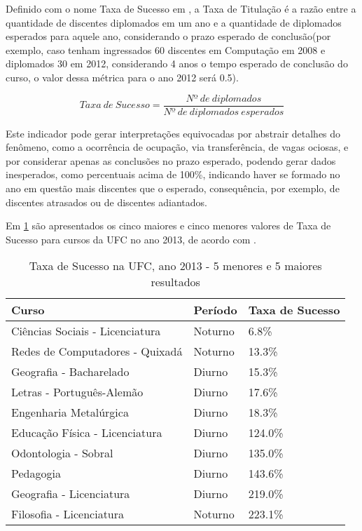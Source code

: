 
Definido com o nome Taxa de Sucesso em \cite{indicadores_TCU}, a Taxa de Titulação é a razão entre a quantidade de discentes diplomados em um ano e a quantidade de diplomados esperados para aquele ano, considerando o prazo esperado de conclusão(por exemplo, caso tenham ingressados 60 discentes em Computação em 2008 e diplomados 30 em 2012, considerando 4 anos o tempo esperado de conclusão do curso, o valor dessa métrica para o ano 2012 será 0.5).

\begin{equation}
Taxa\ de\ Sucesso=\frac{Nº\ de\ diplomados}{Nº\ de\ diplomados\ esperados}
\end{equation}

Este indicador pode gerar interpretações equivocadas por abstrair detalhes do fenômeno, como a ocorrência de ocupação, via transferência, de vagas ociosas, e por considerar apenas as conclusões no prazo esperado, podendo gerar dados inesperados, como percentuais acima de 100\%, indicando haver se formado no ano em questão mais discentes que o esperado, consequência, por exemplo, de discentes atrasados ou de discentes adiantados.

Em \ref{table:ts_2013} são apresentados os cinco maiores e cinco menores valores de Taxa de Sucesso para cursos da UFC no ano 2013, de acordo com \cite{anuario_estatistico}.

\begin{table}

\begin{tabular}{lll}
\toprule
                           Curso &  Período & Taxa de Sucesso \\
\midrule
 Ciências Sociais - Licenciatura &  Noturno &    6.8\% \\
 Redes de Computadores - Quixadá &  Noturno &   13.3\% \\
         Geografia - Bacharelado &   Diurno &   15.3\% \\
       Letras - Português-Alemão &   Diurno &   17.6\% \\
          Engenharia Metalúrgica &   Diurno &   18.3\% \\
  Educação Física - Licenciatura &   Diurno &  124.0\% \\
            Odontologia - Sobral &   Diurno &  135.0\% \\
                       Pedagogia &   Diurno &  143.6\% \\
        Geografia - Licenciatura &   Diurno &  219.0\% \\
        Filosofia - Licenciatura &  Noturno &  223.1\% \\
\bottomrule
\end{tabular}

\caption{Taxa de Sucesso na UFC, ano 2013 - 5 menores e 5 maiores resultados}
\label{table:ts_2013}

\end{table}

